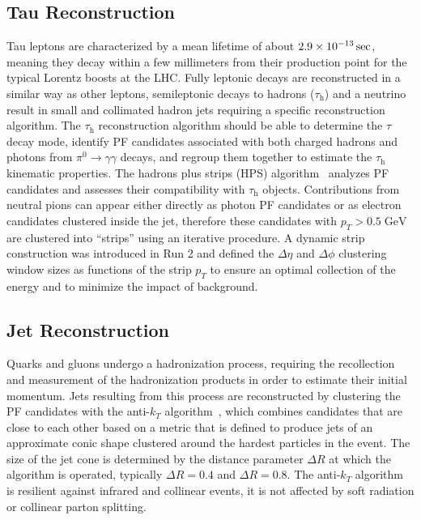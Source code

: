 \subsection{Tau Reconstruction}
\label{sec:tau_reco}
Tau leptons are characterized by a mean lifetime of about $2.9\times \text{10}^\text{$-$13}\sec$, meaning they decay within a few millimeters from their production point for the typical Lorentz boosts at the LHC. Fully leptonic decays are reconstructed in a similar way as other leptons, semileptonic decays to hadrons ($\tau_\text{h}$) and a neutrino result in small and collimated hadron jets requiring a specific reconstruction algorithm. The $\tau_\text{h}$ reconstruction algorithm should be able to determine the $\tau$ decay mode, identify PF candidates associated with both charged hadrons and photons from $\pi^0 \rightarrow \gamma\gamma$ decays, and regroup them together to estimate the $\tau_\text{h}$ kinematic properties. The hadrons plus strips (HPS) algorithm~\cite{CMS:2011eio,CMS:2015pac} analyzes PF candidates and assesses their compatibility with $\tau_\text{h}$ objects. Contributions from neutral pions can appear either directly as photon PF candidates or as electron candidates clustered inside the jet, therefore these candidates with $p_T > 0.5 \;\text{GeV}$ are clustered into ``strips'' using an iterative procedure. A dynamic strip construction was introduced in Run 2 and defined the $\Delta\eta$ and $\Delta\phi$ clustering window sizes as functions of the strip $p_T$ to ensure an optimal collection of the energy and to minimize the impact of background.

\subsection{Jet Reconstruction}
\label{sec:jet_reco}
Quarks and gluons undergo a hadronization process, requiring the recollection and measurement of the hadronization products in order to estimate their initial momentum.
Jets resulting from this process are reconstructed by clustering the PF candidates with the anti-$k_T$ algorithm~\cite{Cacciari:2008gp, Cacciari:2011ma}, which combines candidates that are close to each other based on a metric that is defined to produce jets of an approximate conic shape clustered around the hardest particles in the event.
The size of the jet cone is determined by the distance parameter $\Delta R$ at which the algorithm is operated, typically $\Delta R = 0.4$ and $ \Delta R = 0.8$. The anti-$k_T$ algorithm is resilient against infrared and collinear events, \ie it is not affected by soft radiation or collinear parton splitting. 

